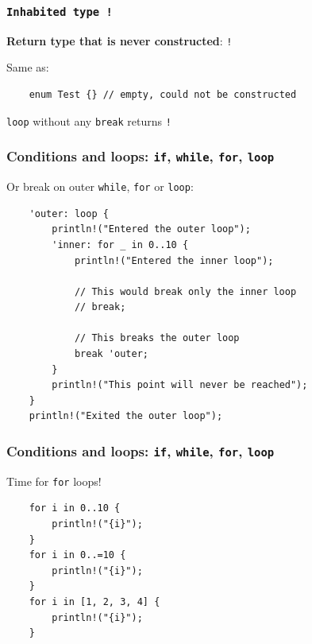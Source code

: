 \documentclass[aspectratio=1610,t]{beamer}
\begin{document}

\begin{frame}[fragile]
\frametitle{\texttt{Inhabited type \texttt{!}}}
\textbf{Return type that is never constructed}: \texttt{!}

Same as:

\begin{verbatim}
    enum Test {} // empty, could not be constructed
\end{verbatim}

\texttt{loop} without any \texttt{break} returns \texttt{!}
\end{frame}


\begin{frame}[fragile]
\frametitle{Conditions and loops: \texttt{if}, \texttt{while}, \texttt{for}, \texttt{loop}}
Or break on outer \texttt{while}, \texttt{for} or \texttt{loop}:

\begin{verbatim}
    'outer: loop {
        println!("Entered the outer loop");
        'inner: for _ in 0..10 {
            println!("Entered the inner loop");

            // This would break only the inner loop
            // break;

            // This breaks the outer loop
            break 'outer;
        }
        println!("This point will never be reached");
    }
    println!("Exited the outer loop");
\end{verbatim}
\end{frame}


\begin{frame}[fragile]
\frametitle{Conditions and loops: \texttt{if}, \texttt{while}, \texttt{for}, \texttt{loop}}
Time for \texttt{for} loops!

\begin{verbatim}
    for i in 0..10 {
        println!("{i}");
    }
    for i in 0..=10 {
        println!("{i}");
    }
    for i in [1, 2, 3, 4] {
        println!("{i}");
    }
\end{verbatim}
\end{frame}

\end{document}
